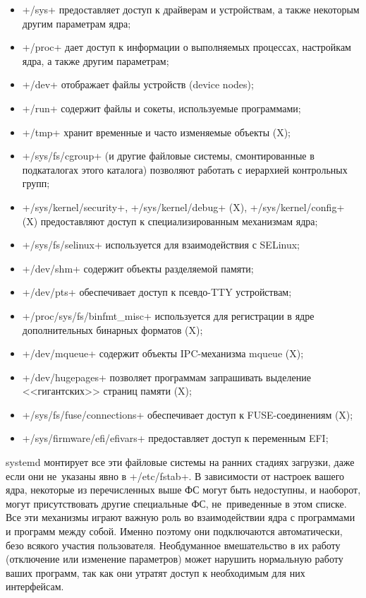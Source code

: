 \documentclass[10pt,oneside,a4paper]{article}
\begin{document}
\begin{itemize}
	\item +/sys+ предоставляет доступ к драйверам и устройствам, а также
		некоторым другим параметрам ядра;
	\item +/proc+ дает доступ к информации о выполняемых процессах,
		настройкам ядра, а также другим параметрам;
	\item +/dev+ отображает файлы устройств (device nodes);
	\item +/run+ содержит файлы и сокеты, используемые программами;
	\item +/tmp+ хранит временные и часто изменяемые объекты (X);
	\item +/sys/fs/cgroup+ (и другие файловые системы, смонтированные в
		подкаталогах этого каталога) позволяют работать с иерархией
		контрольных групп;
	\item +/sys/kernel/security+, +/sys/kernel/debug+ (X),
		+/sys/kernel/config+ (X) предоставляют доступ к
		специализированным механизмам ядра;
	\item +/sys/fs/selinux+ используется для взаимодействия с SELinux;
	\item +/dev/shm+ содержит объекты разделяемой памяти;
	\item +/dev/pts+ обеспечивает доступ к псевдо-TTY устройствам;
	\item +/proc/sys/fs/binfmt_misc+ используется для регистрации в ядре
		дополнительных бинарных форматов (X);
	\item +/dev/mqueue+ содержит объекты IPC-механизма mqueue (X);
	\item +/dev/hugepages+ позволяет программам запрашивать выделение 
		<<гигантских>> страниц памяти (X);
	\item +/sys/fs/fuse/connections+ обеспечивает доступ к
		FUSE-соединениям (X);
	\item +/sys/firmware/efi/efivars+ предоставляет доступ к переменным EFI;
\end{itemize}

systemd монтирует все эти файловые системы на ранних стадиях загрузки, даже если
они не~указаны явно в +/etc/fstab+. В зависимости от настроек вашего ядра,
некоторые из перечисленных выше ФС могут быть недоступны, и наоборот, могут
присутствовать другие специальные ФС, не~приведенные в этом списке. Все эти
механизмы играют важную роль во взаимодействии ядра с программами и программ
между собой. Именно поэтому они подключаются автоматически, безо всякого участия
пользователя. Необдуманное вмешательство в их работу (отключение или изменение
параметров) может нарушить нормальную работу ваших программ, так как они утратят
доступ к необходимым для них интерфейсам.
\end{document}
